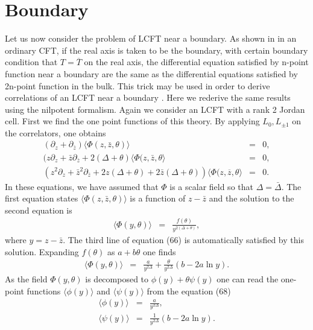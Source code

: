 \documentclass[a4paper,11pt]{article}
\begin{document}
\section{Boundary}
Let us now consider the problem of LCFT near a boundary. As shown
in \cite{cardy} in an ordinary CFT, if the real axis is taken to
be the boundary, with certain boundary condition that
$T=\overline{T}$ on the real axis, the differential equation
satisfied by n-point function near a boundary are the same as the
differential equations satisfied by 2n-point function in the
bulk. This trick may be used in order to derive correlations of
an LCFT near a boundary \cite{kog,MR}. Here we rederive the same
results using the nilpotent formalism. Again we consider an LCFT
with a rank 2 Jordan cell. First we find the one point functions
of this theory. By applying $L_{0},L_{\pm1}$ on the correlators,
one obtains
\begin{eqnarray}\label{eq:a66}
(\partial_{z}+\partial_{\bar{z}})\langle\Phi(z,\bar{z},\theta)
\rangle&=&0 ,\nonumber\\
(z\partial_{z}+\bar{z}\partial_{\bar{z}}+2(\Delta+\theta)
\langle\Phi(z,\bar{z},\theta\rangle&=&0 ,\nonumber\\
(z^{2}\partial_{z}+\bar{z}^{2}\partial_{\bar{z}}+
2z(\Delta+\theta)+2\bar{z}(\Delta+\theta))\langle
\Phi(z,\overline{z},\theta\rangle&=&0 .
\end{eqnarray}
In these equations, we have assumed that $\Phi$ is a scalar field
so that $\Delta=\bar{\Delta}$. The first equation states
$\langle\Phi(z,\bar{z},\theta)\rangle$ is a function of
$z-\bar{z}$ and the solution to the second equation is
\begin{eqnarray}\label{eq:a67}
\langle\Phi(y,\theta)\rangle&=&\frac{f(\theta)}{y^{2(\Delta+\theta)}}
,
\end{eqnarray}
where $y=z-\bar{z}$. The third line of equation (66) is
automatically satisfied by this solution. Expanding $f(\theta)$
as $a+b\theta$ one finds
\begin{eqnarray}\label{eq:a68}
\langle\Phi(y,\theta)\rangle&=&\frac{a}{y^{2\Delta}}+\frac{\theta}{y^{2\Delta}}(b-2a\ln
y).
\end{eqnarray}
As the field $\Phi(y,\theta)$ is decomposed to
$\phi(y)+\theta\psi(y)$ one can read the one-point functions
$\langle\phi(y)\rangle$ and $\langle\psi(y)\rangle$ from the
equation (68)
\begin{eqnarray}\label{eq:a69}
\langle\phi(y)\rangle&=&\frac{a}{y^{2\Delta}},\nonumber\\
\langle\psi(y)\rangle&=&\frac{1}{y^{2\Delta}}(b-2a\ln y) .
\end{eqnarray}
\end{document}
